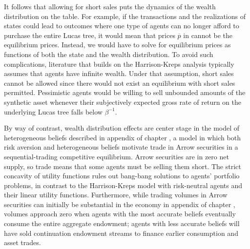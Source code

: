 It follows that allowing for 
short sales puts the dynamics of the wealth 
distribution on the table. For example, if the 
transactions and the realizations of states could lead 
to outcomes where one type of agents can no longer 
afford to purchase the entire Lucas tree, it would 
mean that prices $\overline p$ in  cannot
be the equilibrium prices. Instead, we would have to 
solve for equilibrium prices as functions of both the 
state and the wealth distribution. To avoid 
such complications,  literature that builds on the
Harrison-Kreps analysis typically assumes that agents
have infinite wealth. Under that assumption,  short sales cannot be allowed since there 
would not exist an equilibrium with short sales permitted. Pessimistic agents 
would be willing to sell unbounded amounts of the 
synthetic asset whenever their subjectively expected 
gross rate of return on the underlying Lucas 
tree falls below $\beta^{-1}$.
%
%



By way of contrast, wealth distribution  effects 
are center stage in the model of  heterogeneous beliefs 
described in appendix  of chapter , a model in which   both risk aversion and  heterogeneous beliefs 
motivate trade in Arrow securities in a 
sequential-trading competitive equilibrium.
Arrow securities are in zero net supply, so 
 trade  means that some agents must be selling them short. 
 The strict concavity of 
utility functions rules out  bang-bang solutions
to agents' portfolio problems, in contrast to the 
Harrison-Kreps model with risk-neutral agents and their
linear utility functions. Furthermore, while trading 
volumes in Arrow securities can initially be substantial 
in the economy in appendix  of 
chapter ,  volumes 
approach zero when agents with the most
accurate beliefs eventually  consume the entire
aggregate endowment; agents with less 
accurate beliefs will  have sold  continuation endowment streams to finance earlier consumption 
and asset trades.



